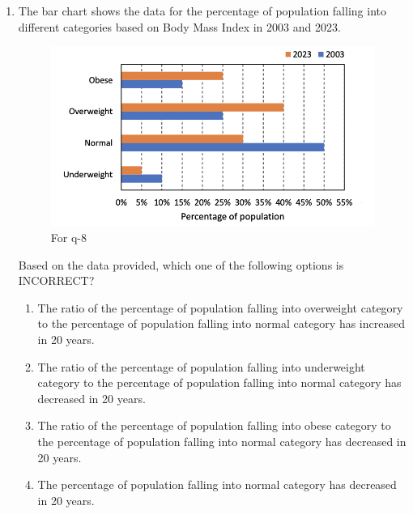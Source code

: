 \documentclass[journal,12pt,onecolumn]{IEEEtran}
\theoremstyle{remark}
\begin{document}
\begin{enumerate}
\item The bar chart shows the data for the percentage of population falling into different categories based on Body Mass Index  in 2003 and 2023.
\begin{figure}[H]
    \centering
    \includegraphics[width=0.8\columnwidth]{q8.png}
    \caption{For q-8}
    \label{fig:q8}
\end{figure}
Based on the data provided, which one of the following options is INCORRECT?
\hfill{}
\begin{enumerate}
    \item The ratio of the percentage of population falling into overweight category to the percentage of population falling into normal category has increased in 20 years.
    \item The ratio of the percentage of population falling into underweight category to the percentage of population falling into normal category has decreased in 20 years.
    \item The ratio of the percentage of population falling into obese category to the percentage of population falling into normal category has decreased in 20 years.
    \item The percentage of population falling into normal category has decreased in 20 years.
\end{enumerate}


\end{enumerate}
\end{document}
